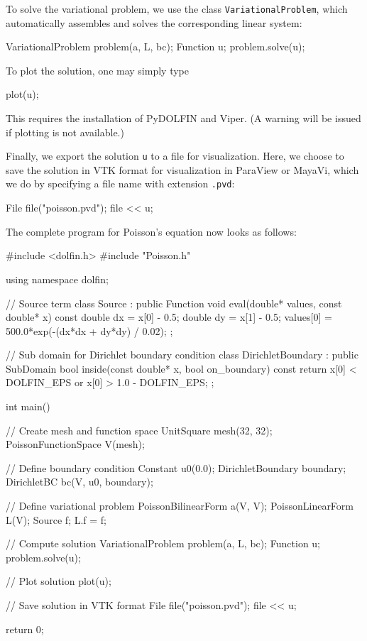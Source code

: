 To solve the variational problem, we use the class
\texttt{VariationalProblem}, which automatically assembles and solves
the corresponding linear system:
\begin{code}
VariationalProblem problem(a, L, bc);
Function u;
problem.solve(u);
\end{code}

To plot the solution, one may simply type
\begin{code}
plot(u);
\end{code}
This requires the installation of PyDOLFIN and Viper. (A warning will
be issued if plotting is not available.)

Finally, we export the solution \texttt{u} to a file for
visualization. Here, we choose to save the solution in VTK format for
visualization in ParaView or MayaVi, which we do by specifying a file
name with extension \texttt{.pvd}:
\begin{code}
File file("poisson.pvd");
file << u;
\end{code}

The complete program for Poisson's equation now looks as follows:
\small
\begin{code}
#include <dolfin.h>
#include "Poisson.h"

using namespace dolfin;

// Source term
class Source : public Function
{
  void eval(double* values, const double* x) const
  {
    double dx = x[0] - 0.5;
    double dy = x[1] - 0.5;
    values[0] = 500.0*exp(-(dx*dx + dy*dy) / 0.02);
  }
};

// Sub domain for Dirichlet boundary condition
class DirichletBoundary : public SubDomain
{
  bool inside(const double* x, bool on_boundary) const
  {
    return x[0] < DOLFIN_EPS or x[0] > 1.0 - DOLFIN_EPS;
  }
};

int main()
{
  // Create mesh and function space
  UnitSquare mesh(32, 32);
  PoissonFunctionSpace V(mesh);

  // Define boundary condition
  Constant u0(0.0);
  DirichletBoundary boundary;
  DirichletBC bc(V, u0, boundary);

  // Define variational problem
  PoissonBilinearForm a(V, V);
  PoissonLinearForm L(V);
  Source f;
  L.f = f;

  // Compute solution
  VariationalProblem problem(a, L, bc);
  Function u;
  problem.solve(u);

  // Plot solution
  plot(u);

  // Save solution in VTK format
  File file("poisson.pvd");
  file << u;

  return 0;
}
\end{code}
\normalsize

